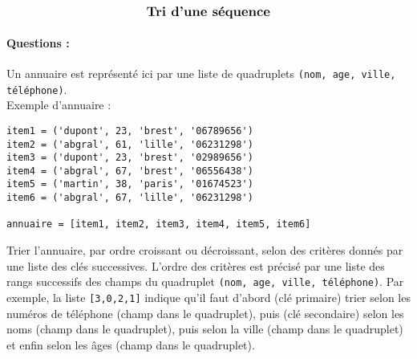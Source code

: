 \documentclass[11pt,a4paper]{article}
\begin{document}
\entete

\autoevaluation


$$\mbox{\textbf{\large Tri d'une séquence}}$$


\paragraph{Questions :}
Un annuaire est représenté ici par une liste de quadruplets 
\texttt{(nom, age, ville, téléphone)}.\\
Exemple d'annuaire :
\begin{minipage}[t]{7cm}
\begin{Verbatim}
item1 = ('dupont', 23, 'brest', '06789656')
item2 = ('abgral', 61, 'lille', '06231298')
item3 = ('dupont', 23, 'brest', '02989656')
item4 = ('abgral', 67, 'brest', '06556438')
item5 = ('martin', 38, 'paris', '01674523')
item6 = ('abgral', 67, 'lille', '06231298')

annuaire = [item1, item2, item3, item4, item5, item6]
\end{Verbatim}
\end{minipage}
\vspace*{3mm}

Trier l'annuaire, par ordre croissant ou décroissant, selon des critères donnés 
par une liste des clés successives. 
L'ordre des critères est précisé par une liste des rangs successifs des champs du quadruplet
\texttt{(nom, age, ville, téléphone)}. Par exemple, la liste \texttt{[3,0,2,1]} indique
qu'il faut d'abord (clé primaire) trier selon les numéros de téléphone (champ  dans le quadruplet), puis (clé secondaire) selon les noms (champ  dans le quadruplet), 
puis selon la ville (champ  dans le quadruplet) et enfin selon les âges 
(champ  dans le quadruplet).
\end{document}
